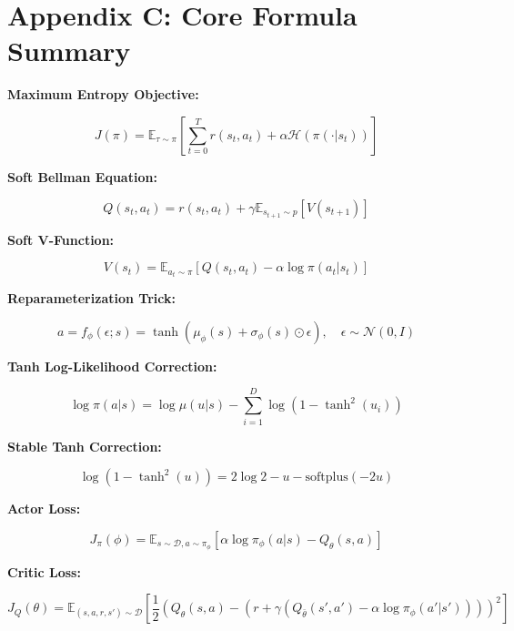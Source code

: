 \documentclass[12pt,a4paper]{article}
\theoremstyle{noteplain}
\theoremstyle{noteexercise}
\begin{document}



\section{Appendix C: Core Formula Summary}\label{sec:appendix-c}



\textbf{Maximum Entropy Objective:}

$$J(\pi) = \mathbb{E}_{\tau \sim \pi}\left[\sum_{t=0}^{T} r(s_t, a_t) + \alpha \mathcal{H}(\pi(\cdot|s_t))\right]$$



\textbf{Soft Bellman Equation:}

$$Q(s_t, a_t) = r(s_t, a_t) + \gamma \mathbb{E}_{s_{t+1} \sim p}[V(s_{t+1})]$$



\textbf{Soft V-Function:}

$$V(s_t) = \mathbb{E}_{a_t \sim \pi}[Q(s_t, a_t) - \alpha \log\pi(a_t|s_t)]$$



\textbf{Reparameterization Trick:}

$$a = f_\phi(\epsilon; s) = \tanh(\mu_\phi(s) + \sigma_\phi(s) \odot \epsilon), \quad \epsilon \sim \mathcal{N}(0, I)$$



\textbf{Tanh Log-Likelihood Correction:}

$$\log\pi(a|s) = \log\mu(u|s) - \sum_{i=1}^{D} \log(1 - \tanh^2(u_i))$$



\textbf{Stable Tanh Correction:}

$$\log(1 - \tanh^2(u)) = 2\log 2 - u - \text{softplus}(-2u)$$



\textbf{Actor Loss:}

$$J_\pi(\phi) = \mathbb{E}_{s \sim \mathcal{D}, a \sim \pi_\phi}[\alpha \log\pi_\phi(a|s) - Q_\theta(s,a)]$$



\textbf{Critic Loss:}

$$J_Q(\theta) = \mathbb{E}_{(s,a,r,s') \sim \mathcal{D}}\left[\frac{1}{2}\left(Q_\theta(s,a) - (r + \gamma(Q_{\bar{\theta}}(s', a') - \alpha \log\pi_\phi(a'|s')))\right)^2\right]$$
\end{document}
